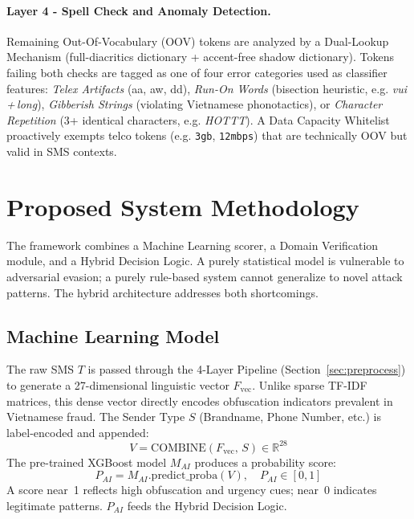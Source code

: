 \documentclass[conference]{IEEEtran}
\begin{document}
\paragraph{Layer 4 - Spell Check and Anomaly Detection.}
Remaining Out-Of-Vocabulary (OOV) tokens are analyzed by a Dual-Lookup
Mechanism (full-diacritics dictionary + accent-free shadow dictionary).
Tokens failing both checks are tagged as one of four error categories used
as classifier features: \textit{Telex Artifacts} (aa, aw,
dd), \textit{Run-On Words} (bisection heuristic, e.g.
\textit{vui\,+\,long}), \textit{Gibberish Strings} (violating Vietnamese
phonotactics), or \textit{Character Repetition} (3+ identical characters,
e.g. \textit{HOTTT}). A Data Capacity Whitelist proactively exempts
telco tokens (e.g. \texttt{3gb}, \texttt{12mbps}) that are technically OOV
but valid in SMS contexts.

\section{Proposed System Methodology}
\label{sec:method}

The framework combines a Machine Learning scorer, a Domain Verification
module, and a Hybrid Decision Logic. A purely statistical model is vulnerable
to adversarial evasion; a purely rule-based system cannot generalize to novel
attack patterns. The hybrid architecture addresses both shortcomings.

\subsection{Machine Learning Model}
\label{subsec:ml}

The raw SMS $T$ is passed through the 4-Layer Pipeline
(Section~\ref{sec:preprocess}) to generate a 27-dimensional linguistic vector
$F_\text{vec}$. Unlike sparse TF-IDF matrices, this dense vector directly
encodes obfuscation indicators prevalent in Vietnamese fraud. The Sender
Type $S$ (Brandname, Phone Number, etc.) is label-encoded and appended:
\begin{equation}
    V = \text{COMBINE}(F_\text{vec},\, S) \in \mathbb{R}^{28}
\end{equation}
The pre-trained XGBoost model $M_{AI}$ produces a probability score:
\begin{equation}
    P_{AI} = M_{AI}.\text{predict\_proba}(V), \quad P_{AI} \in [0, 1]
\end{equation}
A score near~1 reflects high obfuscation and urgency cues; near~0 indicates
legitimate patterns. $P_{AI}$ feeds the Hybrid Decision Logic.
\end{document}
